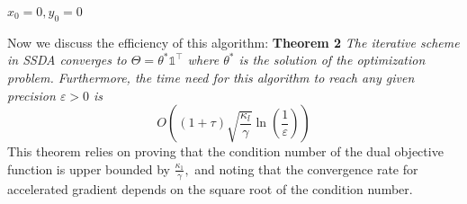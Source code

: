 \documentclass[12pt]{article}
\begin{document}
\begin{algorithm}[H]
	\SetAlgoLined
	$x _ { 0 } = 0 , y _ { 0 } = 0$\\
\end{algorithm}
Now we discuss the efficiency of this algorithm:
\newline
\textbf{Theorem 2}
\textit{The iterative scheme in SSDA converges to $\Theta = \theta ^ { * } \mathbb { 1 } ^ { \top }$ where $\theta ^ { * }$ is the solution of
the optimization problem. Furthermore, the time need for this algorithm to reach any given precision $\varepsilon > 0$ is }$$
O \left( ( 1 + \tau ) \sqrt { \frac { \kappa _ { l } } { \gamma } } \ln \left( \frac { 1 } { \varepsilon } \right) \right)
$$
This theorem relies on proving that the condition number of the dual objective function is upper
bounded by $\frac { \kappa _ { 1 } } { \gamma } ,$ and noting that the convergence rate for accelerated gradient depends on the
square root of the condition number.
\end{document}
